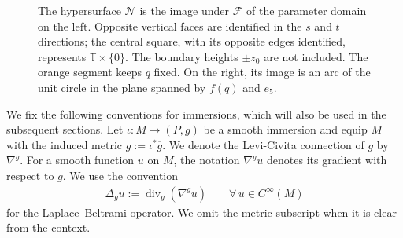 \documentclass[a4paper,11pt,oneside,reqno]{amsart}
\numberwithin{equation}{section}
\theoremstyle{definition}
\begin{document}
\begin{figure}[htbp]
    \endgroup
    \caption{The hypersurface $\mathcal N$ is the image under
    $\mathcal F$ of the parameter domain on the left.
    Opposite vertical faces are identified in the $s$ and
    $t$ directions; the central square, with its opposite
    edges identified, represents $\mathbb T\times\{0\}$.
    The boundary heights $\pm z_0$ are not included.
    The orange segment keeps $q$ fixed.
    On the right, its image is an arc of the unit circle
    in the plane spanned by $f(q)$ and $e_5$.
    }
    \label{fig:s4-band-coordinates}
\end{figure}

%
We fix the following conventions for immersions, which will
also be used in the subsequent sections.
Let $\iota:M\to(P,\overline g)$ be a smooth immersion and
equip $M$ with the induced metric $g:=\iota^*\overline g$.
We denote the Levi-Civita connection of $g$ by $\nabla^g$.
For a smooth function $u$ on $M$, the notation $\nabla^g u$
denotes its gradient with respect to $g$. We use the convention
%
\begin{align*}
    \Delta_g u:=\operatorname{div}_g(\nabla^g u)
    \qquad\forall\,u\in C^\infty(M)
\end{align*}
%
for the Laplace--Beltrami operator.
We omit the metric subscript when it is clear from the context.
\end{document}
